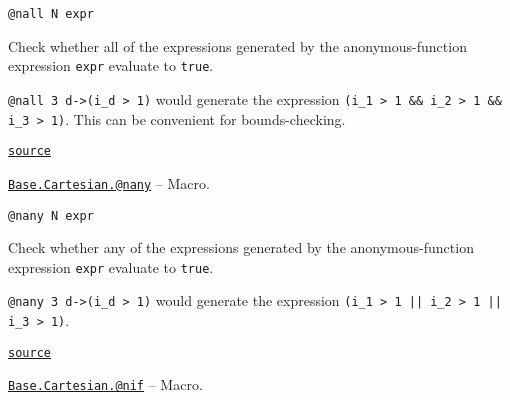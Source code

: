 \begin{adjustwidth}{2em}{0pt}


\begin{verbatim}
@nall N expr
\end{verbatim}

Check whether all of the expressions generated by the anonymous-function expression \texttt{expr} evaluate to \texttt{true}.

\texttt{@nall 3 d->(i\_d > 1)} would generate the expression \texttt{(i\_1 > 1 \&\& i\_2 > 1 \&\& i\_3 > 1)}. This can be convenient for bounds-checking.



\href{https://github.com/JuliaLang/julia/blob/2d472c633d66e7697dda5aff75d2367b823048b8/base/cartesian.jl#L160-L168}{\texttt{source}}


\end{adjustwidth}
\hypertarget{11114957141394185901}{}
\hyperlink{11114957141394185901}{\texttt{Base.Cartesian.@nany}}  -- {Macro.}

\begin{adjustwidth}{2em}{0pt}


\begin{verbatim}
@nany N expr
\end{verbatim}

Check whether any of the expressions generated by the anonymous-function expression \texttt{expr} evaluate to \texttt{true}.

\texttt{@nany 3 d->(i\_d > 1)} would generate the expression \texttt{(i\_1 > 1 || i\_2 > 1 || i\_3 > 1)}.



\href{https://github.com/JuliaLang/julia/blob/2d472c633d66e7697dda5aff75d2367b823048b8/base/cartesian.jl#L177-L184}{\texttt{source}}


\end{adjustwidth}
\hypertarget{2428714678347040919}{}
\hyperlink{2428714678347040919}{\texttt{Base.Cartesian.@nif}}  -- {Macro.}

